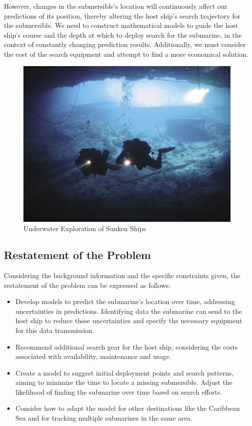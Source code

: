 \documentclass[12pt]{article}
\begin{document}
However, changes in the submersible's location will continuously affect our predictions of its position, thereby altering the host ship's search trajectory for the submersible. We need to construct mathematical models to guide the host ship's course and the depth at which to deploy search for the submarine, in the context of constantly changing prediction results. Additionally, we must consider the cost of the search equipment and attempt to find a more economical solution.

\begin{figure}[H]
\centering
\includegraphics[width=.7\textwidth]{sunkenships.png}
\caption{Underwater Exploration of Sunken Ships}
\label{fig:Fire Situation}
\end{figure}

\subsection{Restatement of the Problem}
Considering the background information and the specific constraints given, the restatement of the problem can be expressed as follows:

\begin{itemize}
\setlength{\parsep}{0ex}
\setlength{\topsep}{2ex}
\setlength{\itemsep}{1ex}
\item Develop models to predict the submarine's location over time, addressing uncertainties in predictions. Identifying data the submarine can send to the host ship to reduce these uncertainties and specify the necessary equipment for this data transmission. 
\item Recommend additional search gear for the host ship, considering the costs associated with availability, maintenance and usage. 
\item Create a model to suggest initial deployment points and search patterns, aiming to minimize the time to locate a missing submersible. Adjust the likelihood of finding the submarine over time based on search efforts.
\item Consider how to adapt the model for other destinations like the Caribbean Sea and for tracking multiple submarines in the same area.
\end{itemize}
\end{document}
